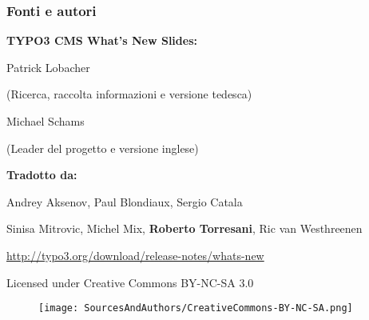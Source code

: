 \begin{frame}[fragile]
	\frametitle{Fonti e autori}

	\vspace{-0.6cm}

	\centerline{\textbf{TYPO3 CMS What's New Slides:}}

	\begin{center}
		\smaller
			\centerline{Patrick Lobacher}
			\centerline{(Ricerca, raccolta informazioni e versione tedesca)}
			\vspace{0.1cm}
			\centerline{Michael Schams}
			\centerline{(Leader del progetto e versione inglese)}
		\normalsize
	\end{center}
	\vspace{-0.6cm}
	\begin{center}
		\smaller
			\centerline{\textbf{Tradotto da:}}
			\centerline{Andrey Aksenov, Paul Blondiaux, Sergio Catala}
			\centerline{Sinisa Mitrovic, Michel Mix, \textbf{Roberto Torresani}, Ric van Westhreenen}
		\normalsize
	\end{center}
	\vspace{-0.6cm}
	\smaller\begin{center}\url{http://typo3.org/download/release-notes/whats-new}\end{center}\normalsize

	\smaller\begin{center}Licensed under Creative Commons BY-NC-SA 3.0\end{center}\normalsize
	\begin{figure}\vspace*{-0.3cm}
		\texttt{[image: SourcesAndAuthors/CreativeCommons-BY-NC-SA.png]}
	\end{figure}

\end{frame}

